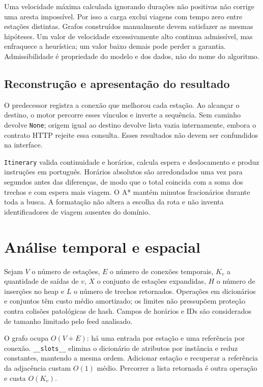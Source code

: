 \documentclass[12pt]{article}
\newcommand{\code}[1]{\texttt{#1}}
\begin{document}
Uma velocidade máxima calculada ignorando durações não positivas não corrige uma aresta impossível. Por isso a carga exclui viagens com tempo zero entre estações distintas. Grafos construídos manualmente devem satisfazer as mesmas hipóteses. Um valor de velocidade excessivamente alto continua admissível, mas enfraquece a heurística; um valor baixo demais pode perder a garantia. Admissibilidade é propriedade do modelo e dos dados, não do nome do algoritmo.

\subsection{Reconstrução e apresentação do resultado}
O predecessor registra a conexão que melhorou cada estação. Ao alcançar o destino, o motor percorre esses vínculos e inverte a sequência. Sem caminho devolve \code{None}; origem igual ao destino devolve lista vazia internamente, embora o contrato HTTP rejeite essa consulta. Esses resultados não devem ser confundidos na interface.

\code{Itinerary} valida continuidade e horários, calcula espera e deslocamento e produz instruções em português. Horários absolutos são arredondados uma vez para segundos antes das diferenças, de modo que o total coincida com a soma dos trechos e com espera mais viagem. O A* mantém minutos fracionários durante toda a busca. A formatação não altera a escolha da rota e não inventa identificadores de viagem ausentes do domínio.

\section{Análise temporal e espacial}
Sejam $V$ o número de estações, $E$ o número de conexões temporais, $K_v$ a quantidade de saídas de $v$, $X$ o conjunto de estações expandidas, $H$ o número de inserções no heap e $L$ o número de trechos retornados. Operações em dicionários e conjuntos têm custo médio amortizado; os limites não pressupõem proteção contra colisões patológicas de hash. Campos de horários e IDs são considerados de tamanho limitado pelo feed analisado.

O grafo ocupa $O(V+E)$: há uma entrada por estação e uma referência por conexão. \code{\_\_slots\_\_} elimina o dicionário de atributos por instância e reduz constantes, mantendo a mesma ordem. Adicionar estação e recuperar a referência da adjacência custam $O(1)$ médio. Percorrer a lista retornada é outra operação e custa $O(K_v)$.
\end{document}
